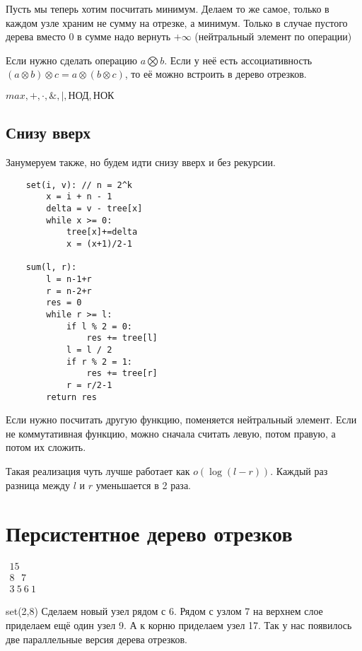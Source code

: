 \documentclass{book}
\theoremstyle{definition}
\begin{document}
    Пусть мы теперь хотим посчитать минимум. Делаем то же самое, только в каждом узле храним не сумму на отрезке, а минимум. Только в случае пустого дерева вместо 0 в сумме надо вернуть $+\infty $ (нейтральный элемент по операции)

    Если нужно сделать операцию $a \bigotimes b$. Если у неё есть ассоциативность  $(a\otimes b)\otimes c = a\otimes (b\otimes c)$, то её можно встроить в дерево отрезков. 

$max, +, \cdot , \&, |, \text{НОД}, \text{НОК}$ 

\subsection{Снизу вверх}

Занумеруем также, но будем идти снизу вверх и без рекурсии.

\begin{verbatim}
    set(i, v): // n = 2^k
        x = i + n - 1
        delta = v - tree[x]
        while x >= 0:
            tree[x]+=delta
            x = (x+1)/2-1

    sum(l, r):
        l = n-1+r
        r = n-2+r
        res = 0
        while r >= l:
            if l % 2 = 0:
                res += tree[l]
            l = l / 2
            if r % 2 = 1:
                res += tree[r]
            r = r/2-1
        return res
\end{verbatim}

Если нужно посчитать другую функцию, поменяется нейтральный элемент. Если не коммутативная функцию, можно сначала считать левую, потом правую, а потом их сложить.

Такая реализация чуть лучше работает как $o(\log (l-r))$. Каждый раз разница между $ l$ и $r$ уменьшается в 2 раза.  

\section{Персистентное дерево отрезков}

$\begin{array}{c}
     15\\ 8 ~ ~ ~7\\ 3~5~6~1
 \end{array}
$

set(2,8) Сделаем новый узел рядом с 6. Рядом с узлом 7 на верхнем слое приделаем ещё один узел 9. А к корню приделаем узел 17. Так у нас появилось две параллельные версия дерева отрезков.
 
\end{document}
